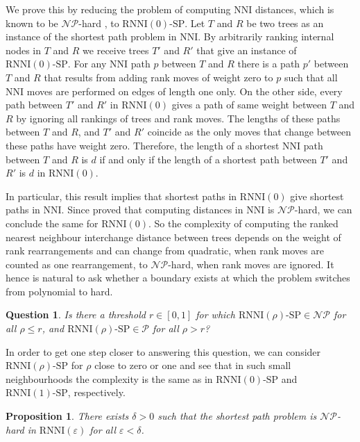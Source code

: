 \documentclass[11pt]{amsart}
\newtheorem{proposition}{Proposition}
\newtheorem{question}{Question}
\newcommand{\rnni}{\mathrm{RNNI}}
\newcommand{\nni}{\mathrm{NNI}}
\newcommand{\np}{\mathcal{NP}}
\newcommand{\p}{\mathcal{P}}
\newcommand{\decprob}[1]{\rnni(#1)\text{-}\mathrm{SP}}
\newcommand{\summary}[1]{} %
\begin{document}
\proof
We prove this by reducing the problem of computing $\nni$ distances, which is known to be $\np$-hard \autocite{Dasgupta2000-xa}, to $\decprob{0}$.
Let $T$ and $R$ be two trees as an instance of the shortest path problem in $\nni$.
By arbitrarily ranking internal nodes in $T$ and $R$ we receive trees $T'$ and $R'$ that give an instance of $\decprob{0}$.
For any $\nni$ path $p$ between $T$ and $R$ there is a path $p'$ between $T$ and $R$ that results from adding rank moves of weight zero to $p$ such that all $\nni$ moves are performed on edges of length one only.
On the other side, every path between $T'$ and $R'$ in $\rnni(0)$ gives a path of same weight between $T$ and $R$ by ignoring all rankings of trees and rank moves.
The lengths of these paths between $T$ and $R$, and $T'$ and $R'$ coincide as the only moves that change between these paths have weight zero.
Therefore, the length of a shortest $\nni$ path between $T$ and $R$ is $d$ if and only if the length of a shortest path between $T'$ and $R'$ is $d$ in $\rnni(0)$.
\endproof

\summary{Complexity of $\decprob{\rho}$ changes somewhere between zero and one -- where remains an open question}
In particular, this result implies that shortest paths in $\rnni(0)$ give shortest paths in $\nni$.
Since \textcite{Dasgupta2000-xa} proved that computing distances in $\nni$ is $\np$-hard, we can conclude the same for $\rnni(0)$.
So the complexity of computing the ranked nearest neighbour interchange distance between trees depends on the weight of rank rearrangements and can change from quadratic, when rank moves are counted as one rearrangement, to $\np$-hard, when rank moves are ignored.
It hence is natural to ask whether a boundary exists at which the problem switches from polynomial to hard.

\begin{question}
Is there a threshold $r \in [0,1]$ for which $\decprob{\rho} \in \np$ for all $\rho \leq r$, and $\decprob{\rho} \in \p$ for all $\rho > r$?
\end{question}

\summary{Getting one step closer to answer this question by considering small neighbourhoods for $\rho$ around zero and one}
In order to get one step closer to answering this question, we can consider $\decprob{\rho}$ for $\rho$ close to zero or one and see that in such small neighbourhoods the complexity is the same as in $\decprob{0}$ and $\decprob{1}$, respectively.

\begin{proposition}
There exists $\delta > 0$ such that the shortest path problem is $\np$-hard in $\rnni(\varepsilon)$ for all $\varepsilon < \delta$.
\label{thm:complexity_around_nni}
\end{proposition}
\end{document}
